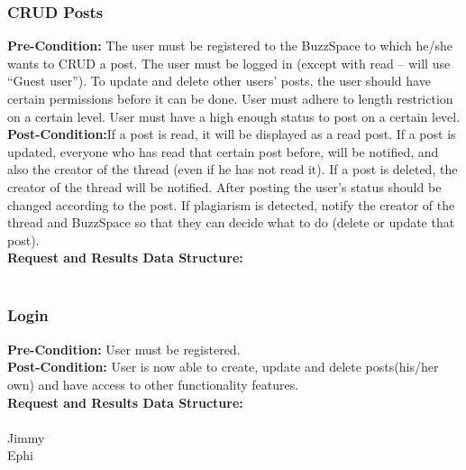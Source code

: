 \documentclass[a4paper,11pt]{article}
\begin{document}
\subsubsection{CRUD Posts}
\textbf{Pre-Condition:} The user must be registered to the BuzzSpace to which he/she wants to CRUD a post.
The user must be logged in (except with read – will use “Guest user”).
To update and delete other users’ posts, the user should have certain permissions before it can be done.
User must adhere to length restriction on a certain level.
User must have a high enough status to post on a certain level.
\\
\textbf{Post-Condition:}If a post is read, it will be displayed as a read post.
If a post is updated, everyone who has read that certain post before, will be notified, and also the creator of the thread (even if he has not read it).
If a post is deleted, the creator of the thread will be notified.
After posting the user’s status should be changed according to the post.
If plagiarism is detected, notify the creator of the thread and BuzzSpace so that they can decide what to do (delete or update that post).
\\
\textbf{Request and Results Data Structure:}
\\
\\

\subsubsection{Login}
\textbf{Pre-Condition:} User must be registered.
\\
\textbf{Post-Condition:} User is now able to create, update and delete posts(his/her own) and have access to other functionality features.
\\
\textbf{Request and Results Data Structure:}
\\
\\

Jimmy\\

Ephi\\
\end{document}
